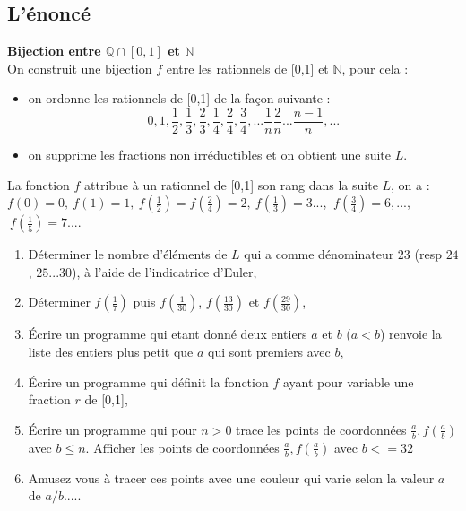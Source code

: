\documentclass[a4paper,11pt]{book}
\newcommand{\Q}{{\mathbb{Q}}}
\newcommand{\N}{{\mathbb{N}}}
\begin{document}
\subsection{L'\'enonc\'e}
{\bf Bijection entre $\Q \cap [0,1]$ et $\N$}\\
On construit une bijection $f$ entre les rationnels de [0,1] et $\N$, 
pour cela :
\begin{itemize}
\item on ordonne les rationnels de [0,1] de la fa\c{c}on suivante :
$$0,1,\frac{1}{2},\frac{1}{3},\frac{2}{3},\frac{1}{4},\frac{2}{4},\frac{3}{4},
...\frac{1}{n}\frac{2}{n}...\frac{n-1}{n},...$$
\item on supprime les fractions non irr\'eductibles et on obtient une suite 
$L$.
\end{itemize}
La fonction $f$ attribue \`a un rationnel de [0,1] son rang dans la 
suite $L$, on a : 
$f(0)=0,\ f(1)=1,\ f(\frac{1}{2})=f(\frac{2}{4})=2,\ f(\frac{1}{3})=3...$,
$\ f(\frac{3}{4})=6,...$, $ \ f(\frac{1}{5})=7....$
\begin{enumerate}
\item D\'eterminer le nombre d'\'el\'ements de $L$ qui a comme d\'enominateur
$23$ (resp $24$, $25$...$30$), \`a l'aide de l'indicatrice d'Euler,
\item D\'eterminer $f(\frac{1}{7})$ puis $f(\frac{1}{30})$, $f(\frac{13}{30})$
et $f(\frac{29}{30})$,
\item \'Ecrire un programme qui etant donn\'e deux entiers $a$ et $b$ ($a<b$) 
renvoie la liste des entiers plus petit que $a$ qui sont premiers avec $b$, 
\item \'Ecrire un programme qui d\'efinit la fonction $f$ ayant pour variable
une fraction $r$ de [0,1],
\item \'Ecrire un programme qui pour $n>0$ trace les points 
de coordonn\'ees $\frac{a}{b},f(\frac{a}{b})$ avec $b \leq n$. Afficher
les points de coordonn\'ees $\frac{a}{b},f(\frac{a}{b})$ avec $b<=32$
\item Amusez vous \`a tracer ces points avec une couleur qui varie selon la 
valeur $a$ de $a/b$.....
\end{enumerate}
\end{document}
